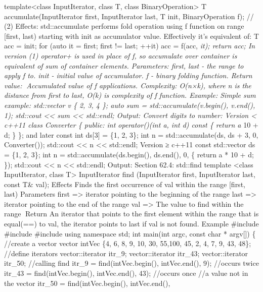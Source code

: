 template\textless class InputIterator, class T, class
BinaryOperation\textgreater{} T accumulate(InputIterator first,
InputIterator last, T init, BinaryOperation f); // (2) Eﬀects:
std::accumulate performs fold operation using f function on range
{[}first, last) starting with init as accumulator value. Eﬀectively it's
equivalent of: T acc = init; for (auto it = first; first != last; ++it)
acc = f(acc, \emph{it); return acc; In version (1) operator+ is used in
place of f, so accumulate over container is equivalent of sum of
container elements. Parameters: first, last - the range to apply f to.
init - initial value of accumulator. f - binary folding function. Return
value: Accumulated value of f applications. Complexity: O(n×k), where n
is the distance from first to last, O(k) is complexity of f function.
Example: Simple sum example: std::vector v \{ 2, 3, 4 \}; auto sum =
std::accumulate(v.begin(), v.end(), 1); std::cout \textless\textless{}
sum \textless\textless{} std::endl; Output: Convert digits to number:
Version \textless{} c++11 class Converter \{ public: int operator()(int
a, int d) const \{ return a } 10 + d; \} \}; and later const int
ds{[}3{]} = \{1, 2, 3\}; int n = std::accumulate(ds, ds + 3, 0,
Converter()); std::cout \textless\textless{} n \textless\textless{}
std::endl; Version ≥ c++11 const std::vector ds = \{1, 2, 3\}; int n =
std::accumulate(ds.begin(), ds.end(), 0, \href{int\%20a,\%20int\%20d}{}
\{ return a * 10 + d; \}); std::cout \textless\textless{} n
\textless\textless{} std::endl; Output: Section 62.4: std::ﬁnd template
\textless class InputIterator, class T\textgreater{} InputIterator find
(InputIterator first, InputIterator last, const T\& val); Eﬀects Finds
the ﬁrst occurrence of val within the range {[}ﬁrst, last) Parameters
first =\textgreater{} iterator pointing to the beginning of the range
last =\textgreater{} iterator pointing to the end of the range val
=\textgreater{} The value to ﬁnd within the range Return An iterator
that points to the ﬁrst element within the range that is equal(==) to
val, the iterator points to last if val is not found. Example \#include
\#include \#include using namespace std; int main(int argc, const char *
argv{[}{]}) \{ //create a vector vector intVec \{4, 6, 8, 9, 10, 30,
55,100, 45, 2, 4, 7, 9, 43, 48\}; //define iterators vector::iterator
itr\_9; vector::iterator itr\_43; vector::iterator itr\_50; //calling
find itr\_9 = find(intVec.begin(), intVec.end(), 9); //occurs twice
itr\_43 = find(intVec.begin(), intVec.end(), 43); //occurs once //a
value not in the vector itr\_50 = find(intVec.begin(), intVec.end(),

